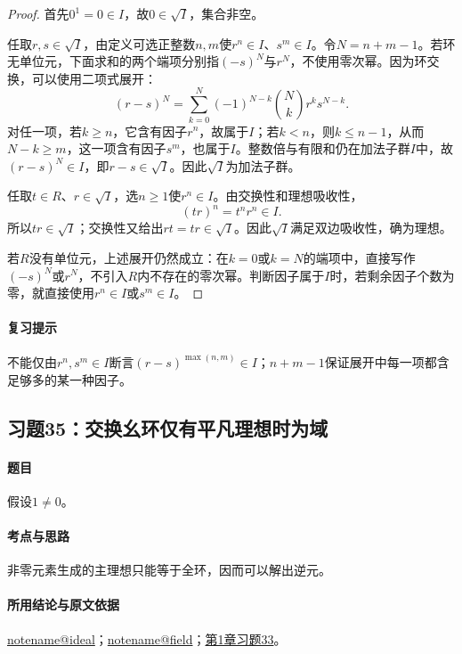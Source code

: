 \documentclass[UTF8,a4paper,11pt,fontset=windows]{ctexart}
\makeatletter
\newcommand{\noteref}[1]{\hyperref[note:#1]{\csname notename@#1\endcsname}}
\newcommand{\exref}[2]{\hyperref[ex:#1:#2]{第#1章习题#2}}
\makeatother
\begin{document}

\begin{proof}
首先$0^1=0\in I$，故$0\in\sqrt I$，集合非空。

任取$r,s\in\sqrt I$，由定义可选正整数$n,m$使$r^n\in I$、$s^m\in I$。令$N=n+m-1$。若环无单位元，下面求和的两个端项分别指$(-s)^N$与$r^N$，不使用零次幂。因为环交换，可以使用二项式展开：
\[
(r-s)^N=\sum_{k=0}^{N}(-1)^{N-k}\binom Nk r^k s^{N-k}.
\]
对任一项，若$k\geq n$，它含有因子$r^n$，故属于$I$；若$k<n$，则$k\leq n-1$，从而$N-k\geq m$，这一项含有因子$s^m$，也属于$I$。整数倍与有限和仍在加法子群$I$中，故$(r-s)^N\in I$，即$r-s\in\sqrt I$。因此$\sqrt I$为加法子群。

任取$t\in R$、$r\in\sqrt I$，选$n\geq1$使$r^n\in I$。由交换性和理想吸收性，
\[
(tr)^n=t^nr^n\in I.
\]
所以$tr\in\sqrt I$；交换性又给出$rt=tr\in\sqrt I$。因此$\sqrt I$满足双边吸收性，确为理想。

若$R$没有单位元，上述展开仍然成立：在$k=0$或$k=N$的端项中，直接写作$(-s)^N$或$r^N$，不引入$R$内不存在的零次幂。判断因子属于$I$时，若剩余因子个数为零，就直接使用$r^n\in I$或$s^m\in I$。
\end{proof}

\paragraph{复习提示}
不能仅由$r^n,s^m\in I$断言$(r-s)^{\max(n,m)}\in I$；$n+m-1$保证展开中每一项都含足够多的某一种因子。


\subsection{习题35：\texorpdfstring{交换幺环仅有平凡理想时为域}{交换幺环仅有平凡理想时为域}}
\label{ex:1:35}

\paragraph{题目}
假设$1\neq0$。

\paragraph{考点与思路}
非零元素生成的主理想只能等于全环，因而可以解出逆元。

\paragraph{所用结论与原文依据}
\noteref{ideal}；\noteref{field}；\exref{1}{33}。
\end{document}
